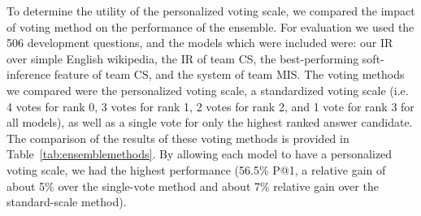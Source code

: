 To determine the utility of the personalized voting scale, we compared the impact of voting method on the performance of the ensemble.  For evaluation we used the 506 development questions, and the models which were included were: our IR over simple English wikipedia, the IR of team CS, the best-performing soft-inference feature of team CS, and the system of team MIS.  The voting methods we compared were the personalized voting scale, a standardized voting scale (i.e. 4 votes for rank 0, 3 votes for rank 1, 2 votes for rank 2, and 1 vote for rank 3 for all models), as well as a single vote for only the highest ranked answer candidate.  The comparison of the results of these voting methods is provided in Table~\ref{tab:ensemblemethods}.  By allowing each model to have a personalized voting scale, we had the highest performance (56.5\% P@1, a relative gain of about 5\% over the single-vote method and about 7\% relative gain over the standard-scale method).
